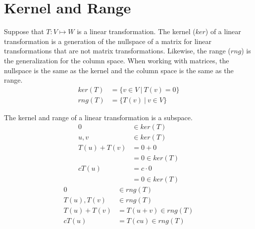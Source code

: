 \documentclass{article}
\theoremstyle{mytheoremstyle}
\theoremstyle{mytheoremstyle}
\theoremstyle{myproblemstyle}
\begin{document}
    \section*{Kernel and Range}
    Suppose that $T: V \mapsto W$ is a linear transformation. The kernel ($ker$)
    of a linear transformation is a generation of the nullspace of a matrix for
    linear transformations that are not matrix transformations. Likewise, the
    range ($rng$) is the generalization for the column space. When working with
    matrices, the nullspace is the same as the kernel and the column space is
    the same as the range.
    \begin{align*}
        ker(T) &= \{ v\in V\ |\ T(v) = 0 \} \\
        rng(T) &= \{T(v)\ |\ v \in V \}
    \end{align*}

    The kernel and range of a linear transformation is a subspace.
    \begin{align*}
        0           &\in ker(T) \\
        u,v         &\in ker(T) \\
        T(u) + T(v) &= 0 + 0 \\
                    &= 0 \in ker(T) \\
        cT(u)       &= c\cdot 0 \\
                    &= 0 \in ker(T)
    \end{align*}
    \begin{align*}
        0           &\in rng(T) \\
        T(u),T(v)   &\in rng(T) \\
        T(u) + T(v) &= T(u+v) \in rng(T) \\
        cT(u) &= T(cu) \in rng(T)
    \end{align*}
\end{document}
